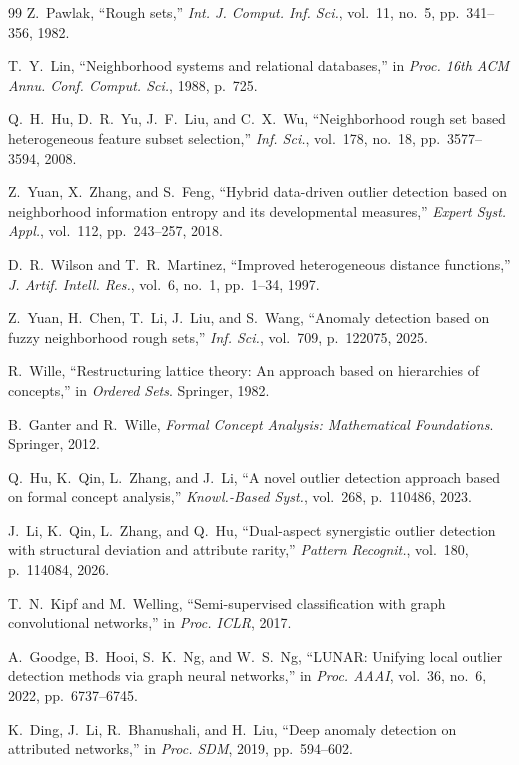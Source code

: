 \documentclass[lettersize,journal]{IEEEtran}
\begin{document}
\begin{thebibliography}{99}
Z.~Pawlak, ``Rough sets,'' \textit{Int. J. Comput. Inf. Sci.}, vol.~11, no.~5, pp.~341--356, 1982.

T.~Y.~Lin, ``Neighborhood systems and relational databases,'' in \textit{Proc. 16th ACM Annu.
Conf. Comput. Sci.}, 1988, p.~725.

Q.~H.~Hu, D.~R.~Yu, J.~F.~Liu, and C.~X.~Wu, ``Neighborhood rough set based heterogeneous
feature subset selection,'' \textit{Inf. Sci.}, vol.~178, no.~18, pp.~3577--3594, 2008.

Z.~Yuan, X.~Zhang, and S.~Feng, ``Hybrid data-driven outlier detection based on neighborhood
information entropy and its developmental measures,'' \textit{Expert Syst. Appl.}, vol.~112,
pp.~243--257, 2018.

D.~R.~Wilson and T.~R.~Martinez, ``Improved heterogeneous distance functions,''
\textit{J. Artif. Intell. Res.}, vol.~6, no.~1, pp.~1--34, 1997.

Z.~Yuan, H.~Chen, T.~Li, J.~Liu, and S.~Wang, ``Anomaly detection based on fuzzy neighborhood
rough sets,'' \textit{Inf. Sci.}, vol.~709, p.~122075, 2025.

R.~Wille, ``Restructuring lattice theory: An approach based on hierarchies of concepts,''
in \textit{Ordered Sets}. Springer, 1982.

B.~Ganter and R.~Wille, \textit{Formal Concept Analysis: Mathematical Foundations}. Springer, 2012.

Q.~Hu, K.~Qin, L.~Zhang, and J.~Li, ``A novel outlier detection approach based on formal
concept analysis,'' \textit{Knowl.-Based Syst.}, vol.~268, p.~110486, 2023.

J.~Li, K.~Qin, L.~Zhang, and Q.~Hu, ``Dual-aspect synergistic outlier detection with
structural deviation and attribute rarity,'' \textit{Pattern Recognit.}, vol.~180, p.~114084, 2026.

T.~N.~Kipf and M.~Welling, ``Semi-supervised classification with graph convolutional networks,''
in \textit{Proc. ICLR}, 2017.

A.~Goodge, B.~Hooi, S.~K.~Ng, and W.~S.~Ng, ``LUNAR: Unifying local outlier detection methods
via graph neural networks,'' in \textit{Proc. AAAI}, vol.~36, no.~6, 2022, pp.~6737--6745.

K.~Ding, J.~Li, R.~Bhanushali, and H.~Liu, ``Deep anomaly detection on attributed networks,''
in \textit{Proc. SDM}, 2019, pp.~594--602.


\end{thebibliography}
\end{document}
